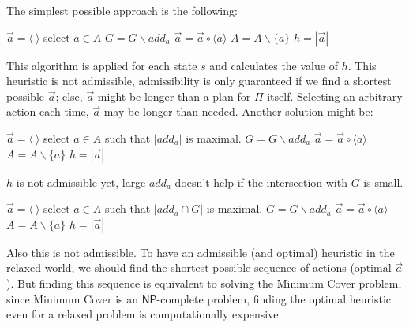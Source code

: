 \documentclass[10pt, letterpaper]{report}
\begin{document}
The simplest possible approach is the following:
\begin{algorithm}
\caption{Solution 1}
\begin{algorithmic}[1]
\State $\vec a=\langle \ \rangle$
\State select $a\in A$
\State $G=G\backslash add_a$ 
\State $\vec a = \vec a \circ \langle a\rangle $
\State $A=A\backslash\{a\}$
\EndWhile
\State\Return $h=|\vec a|$
\end{algorithmic}
\end{algorithm}
This algorithm is applied for each state $s$ and calculates the value of $h$.
This heuristic is not admissible,
admissibility is only guaranteed if we find a
 shortest possible $\vec a$; else, $\vec a$ might be longer than a plan for $\Pi$ itself.
 Selecting an arbitrary action each time, $\vec a$  may be longer than needed. Another solution might be:

 \begin{algorithm}
\caption{Solution 2}
\begin{algorithmic}[1]
\State $\vec a=\langle \ \rangle$
\State select $a\in A$ such that $|add_a|$ is maximal.
\State $G=G\backslash add_a$ 
\State $\vec a = \vec a \circ \langle a\rangle $
\State $A=A\backslash\{a\}$
\EndWhile
\State\Return $h=|\vec a|$
\end{algorithmic}
\end{algorithm}

$h$ is not admissible yet,  large $add_a$ doesn't help if the intersection with $G$ is small. 


 \begin{algorithm}
\caption{Solution 3}
\begin{algorithmic}[1]
\State $\vec a=\langle \ \rangle$
\State select $a\in A$ such that $|add_a\cap G|$ is maximal.
\State $G=G\backslash add_a$ 
\State $\vec a = \vec a \circ \langle a\rangle $
\State $A=A\backslash\{a\}$
\EndWhile
\State\Return $h=|\vec a|$
\end{algorithmic}
\end{algorithm}
\bigskip 

Also this is not admissible. To have an admissible (and optimal) heuristic in the relaxed world, we should find the shortest possible sequence of actions ($\text{optimal } \vec{a}$). But finding this sequence is equivalent to solving the Minimum Cover problem, since Minimum Cover is an $\mathsf{NP}$-complete problem, finding the optimal heuristic even for a relaxed problem is computationally expensive.\bigskip 
\end{document}
